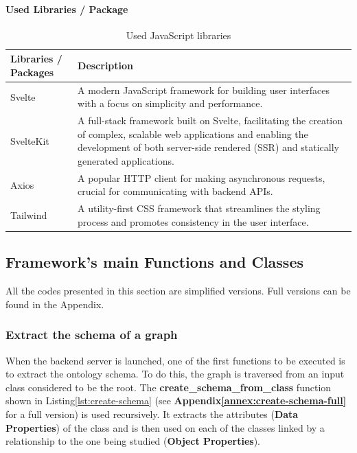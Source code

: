         \paragraph{Used Libraries / Package}
        \begin{table}[h]
            \centering
    	    {
    	    \begin{tabular}{ | m{2.5cm} | m{12cm} | }
                \hline
                \rowcolor{teal!30} Libraries / Packages & Description \\
                
                \hline
                Svelte & A modern JavaScript framework for building user interfaces with a focus on simplicity and performance. \\

                \hline
                SvelteKit & A full-stack framework built on Svelte, facilitating the creation of complex, scalable web applications and enabling the development of both server-side rendered (SSR) and statically generated applications. \\

                \hline
                Axios & A popular HTTP client for making asynchronous requests, crucial for communicating with backend APIs. \\

                \hline
                Tailwind & A utility-first CSS framework that streamlines the styling process and promotes consistency in the user interface.\\

                \hline
            \end{tabular}}
            \caption{\label{tab:js-libs} Used JavaScript libraries}
        \end{table}
        
\subsection{Framework's main Functions and Classes}
All the codes presented in this section are simplified versions. Full versions can be found in the Appendix.\\

\subsubsection{Extract the schema of a graph}
 When the backend server is launched, one of the first functions to be executed is to extract the ontology schema. To do this, the graph is traversed from an input class considered to be the root. The \textbf{create\_schema\_from\_class} function shown in Listing\ref{lst:create-schema} (see \textbf{Appendix\ref{annex:create-schema-full}} for a full version) is used recursively. It extracts the attributes (\textbf{Data Properties}) of the class and is then used on each of the classes linked by a relationship to the one being studied (\textbf{Object Properties}).\\

